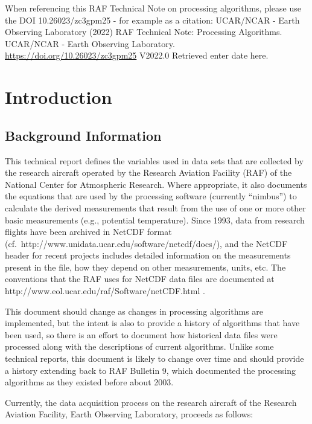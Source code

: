 \documentclass[
]{book}
\begin{document}
When referencing this RAF Technical Note on processing algorithms, please use the DOI 10.26023/zc3gpm25 - for example as a citation: UCAR/NCAR - Earth Observing Laboratory (2022) RAF Technical Note: Processing Algorithms. UCAR/NCAR - Earth Observing Laboratory. \url{https://doi.org/10.26023/zc3gpm25} V2022.0 Retrieved enter date here.

\hypertarget{introduction}{%
\chapter{Introduction}\label{introduction}}

\hypertarget{background-information}{%
\section{Background Information}\label{background-information}}

This technical report defines the variables used in data sets that are collected by the research aircraft operated by the Research Aviation Facility (RAF) of the National Center for Atmospheric Research. Where appropriate, it also documents the equations that are used by the processing software (currently ``nimbus'') to calculate the derived measurements that result from the use of one or more other basic measurements (e.g., potential temperature). Since 1993, data from research flights have been archived in NetCDF format (cf.~http://www.unidata.ucar.edu/software/netcdf/docs/), and the NetCDF header for recent projects includes detailed information on the measurements present in the file, how they depend on other measurements, units, etc. The conventions that the RAF uses for NetCDF data files are documented at http://www.eol.ucar.edu/raf/Software/netCDF.html .

This document should change as changes in processing algorithms are implemented, but the intent is also to provide a history of algorithms that have been used, so there is an effort to document how historical data files were processed along with the descriptions of current algorithms. Unlike some technical reports, this document is likely to change over time and should provide a history extending back to RAF Bulletin 9, which documented the processing algorithms as they existed before about 2003.

Currently, the data acquisition process on the research aircraft of the Research Aviation Facility, Earth Observing Laboratory, proceeds as follows:
\end{document}
